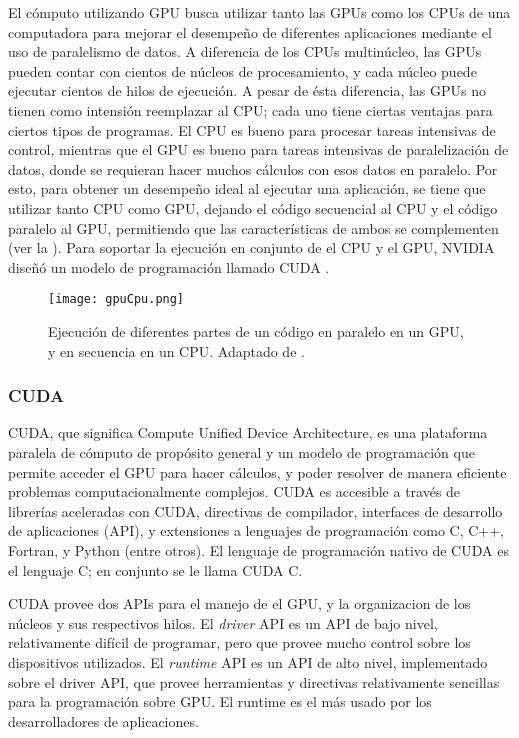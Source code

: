 El cómputo utilizando GPU busca utilizar tanto las GPUs como los CPUs de una computadora para mejorar el desempeño de diferentes aplicaciones mediante el uso de paralelismo de datos. A diferencia de los CPUs multinúcleo, las GPUs pueden contar con cientos de núcleos de procesamiento, y cada núcleo puede ejecutar cientos de hilos de ejecución. A pesar de ésta diferencia, las GPUs no tienen como intensión reemplazar al CPU; cada uno tiene ciertas ventajas para ciertos tipos de programas. El CPU es bueno para procesar tareas intensivas de control, mientras que el GPU es bueno para tareas intensivas de paralelización de datos, donde se requieran hacer muchos cálculos con esos datos en paralelo. Por esto, para obtener un desempeño ideal al ejecutar una aplicación, se tiene que utilizar tanto CPU como GPU, dejando el código secuencial al CPU y el código paralelo al GPU, permitiendo que las características de ambos se complementen (ver la ). Para soportar la ejecución en conjunto de el CPU y el GPU, NVIDIA diseñó un modelo de programación llamado CUDA \citep{cuda2014cheng}. 

\begin{figure}
	\centering
		\texttt{[image: gpuCpu.png]}
	\caption[Separación de código en GPU y CPU.]{Ejecución de diferentes partes de un código en paralelo en un GPU, y en secuencia en un CPU. Adaptado de \citep{cuda2014cheng}.}
		\label{fig:gpuCpu}
\end{figure}

\subsubsection{CUDA}

CUDA, que significa Compute Unified Device Architecture, es una plataforma paralela de cómputo de propósito general y un modelo de programación que permite acceder el GPU para hacer cálculos, y poder resolver de manera eficiente problemas computacionalmente complejos. CUDA es accesible a través de librerías aceleradas con CUDA, directivas de compilador, interfaces de desarrollo de aplicaciones (API), y extensiones a lenguajes de programación como C, C++, Fortran, y Python (entre otros). El lenguaje de programación nativo de CUDA es el lenguaje C; en conjunto se le llama CUDA C.

CUDA provee dos APIs para el manejo de el GPU, y la organizacion de los núcleos y sus respectivos hilos. El \textit{driver} API es un API de bajo nivel, relativamente difícil de programar, pero que provee mucho control sobre los dispositivos utilizados. El \textit{runtime} API es un API de alto nivel, implementado sobre el driver API, que provee herramientas y directivas relativamente sencillas para la programación sobre GPU. El runtime es el más usado por los desarrolladores de aplicaciones.

